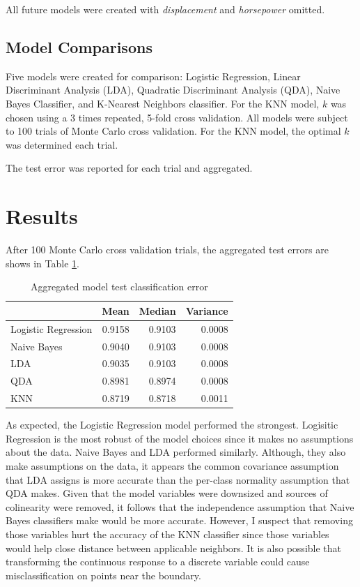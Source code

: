 \documentclass[12pt,letterpaper]{article}
\begin{document}
All future models were created with \textit{displacement} and \textit{horsepower} omitted.

\subsection*{Model Comparisons}

Five models were created for comparison: Logistic Regression, Linear Discriminant Analysis (LDA), Quadratic Discriminant Analysis (QDA), Naive Bayes Classifier, and K-Nearest Neighbors classifier. For the KNN model, $k$ was chosen using a 3 times repeated, 5-fold cross validation. All models were subject to 100 trials of Monte Carlo cross validation. For the KNN model, the optimal $k$ was determined each trial. 

The test error was reported for each trial and aggregated. 

\section*{Results}

After 100 Monte Carlo cross validation trials, the aggregated test errors are shows in Table \ref{tab:results}.

\begin{table}[hbt!]
  \caption{\label{tab:results}Aggregated model test classification error}
  \centering
  \begin{tabular}{|l|r|r|r|}
  \hline
    & Mean & Median & Variance\\
  \hline
  Logistic Regression & 0.9158 & 0.9103 & 0.0008\\
  \hline
  Naive Bayes & 0.9040 & 0.9103 & 0.0008\\
  \hline
  LDA & 0.9035 & 0.9103 & 0.0008\\
  \hline
  QDA & 0.8981 & 0.8974 & 0.0008\\
  \hline
  KNN & 0.8719 & 0.8718 & 0.0011\\
  \hline
  \end{tabular}
\end{table}

As expected, the Logistic Regression model performed the strongest. Logisitic Regression is the most robust of the model choices since it makes no assumptions about the data. Naive Bayes and LDA performed similarly. Although, they also make assumptions on the data, it appears the common covariance assumption that LDA assigns is more accurate than the per-class normality assumption that QDA makes. Given that the model variables were downsized and sources of colinearity were removed, it follows that the independence assumption that Naive Bayes classifiers make would be more accurate. However, I suspect that removing those variables hurt the accuracy of the KNN classifier since those variables would help close distance between applicable neighbors. It is also possible that transforming the continuous response to a discrete variable could cause misclassification on points near the boundary.
\end{document}
